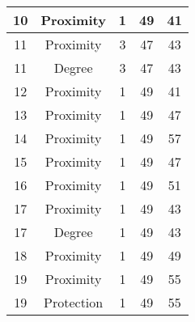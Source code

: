 \documentclass[results.tex]{subfiles}
\begin{document}
\begin{center}
\begin{tabular}{| c || c | c | c | c |}
            \hline
            10                      & Proximity                    & 1                      & 49                      & 41                   \\
            \hline
            11                      & Proximity                    & 3                      & 47                      & 43                   \\
            \hline
            11                      & Degree                       & 3                      & 47                      & 43                   \\
            \hline
            12                      & Proximity                    & 1                      & 49                      & 41                   \\
            \hline
            13                      & Proximity                    & 1                      & 49                      & 47                   \\
            \hline
            14                      & Proximity                    & 1                      & 49                      & 57                   \\
            \hline
            15                      & Proximity                    & 1                      & 49                      & 47                   \\
            \hline
            16                      & Proximity                    & 1                      & 49                      & 51                   \\
            \hline
            17                      & Proximity                    & 1                      & 49                      & 43                   \\
            \hline
            17                      & Degree                       & 1                      & 49                      & 43                   \\
            \hline
            18                      & Proximity                    & 1                      & 49                      & 49                   \\
            \hline
            19                      & Proximity                    & 1                      & 49                      & 55                   \\
            \hline
            19                      & Protection                   & 1                      & 49                      & 55                   \\

\end{tabular}
\end{center}
\end{document}
